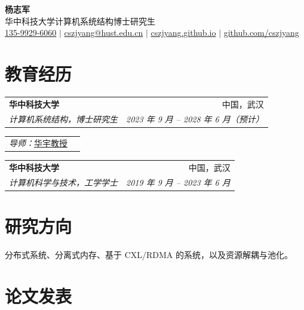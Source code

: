 \documentclass[a4paper,11pt]{article}
\makeatletter
\newcommand{\educationentry}[4]{%
  \begin{tabularx}{\textwidth}{@{}Xr@{}}
    \textbf{#1} & #2 \\
    \textit{#3} & \textit{#4}
  \end{tabularx}%
}
\newcommand{\datedentry}[2]{%
  \begin{tabular*}{\textwidth}{@{\extracolsep{\fill}}lr}
    #1 & #2
  \end{tabular*}%
}
\makeatother
\begin{document}
\begin{center}
  {\Huge\bfseries 杨志军}\\[6pt]
  {\normalsize
    华中科技大学计算机系统结构博士研究生
  }\\[3pt]
  {\small
    \href{tel:+8613599296060}{135-9929-6060}
    \enspace$\vert$\enspace
    \href{mailto:cszjyang@hust.edu.cn}{cszjyang@hust.edu.cn}
    \enspace$\vert$\enspace
    \href{https://cszjyang.github.io/}{cszjyang.github.io}
    \enspace$\vert$\enspace
    \href{https://github.com/cszjyang}{github.com/cszjyang}
  }
\end{center}
\vspace{-0.55em}

\section{教育经历}

\educationentry
  {华中科技大学}
  {中国，武汉}
  {计算机系统结构，博士研究生}
  {2023 年 9 月 -- 2028 年 6 月（预计）}

\vspace{0.15em}
\datedentry
  {\textit{导师：}\href{https://csyhua.github.io/csyhua/index.html}{华宇教授}}
  {}

\vspace{0.30em}
\educationentry
  {华中科技大学}
  {中国，武汉}
  {计算机科学与技术，工学学士}
  {2019 年 9 月 -- 2023 年 6 月}

\section{研究方向}

分布式系统、分离式内存、基于 CXL/RDMA 的系统，以及资源解耦与池化。

\section{论文发表}
\end{document}
